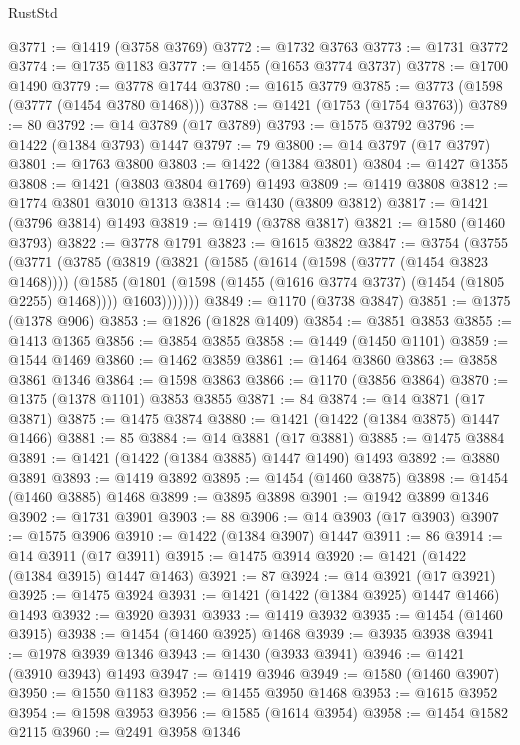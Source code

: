 \begin{lexlean}{RustStd}
\begin{coremodule}
@3771 := @1419 (@3758 @3769)
@3772 := @1732 @3763
@3773 := @1731 @3772
@3774 := @1735 @1183
@3777 := @1455 (@1653 @3774 @3737)
@3778 := @1700 @1490
@3779 := @3778 @1744
@3780 := @1615 @3779
@3785 := @3773 (@1598 (@3777 (@1454 @3780 @1468)))
@3788 := @1421 (@1753 (@1754 @3763))
@3789 := 80
@3792 := @14 @3789 (@17 @3789)
@3793 := @1575 @3792
@3796 := @1422 (@1384 @3793) @1447
@3797 := 79
@3800 := @14 @3797 (@17 @3797)
@3801 := @1763 @3800
@3803 := @1422 (@1384 @3801)
@3804 := @1427 @1355
@3808 := @1421 (@3803 @3804 @1769) @1493
@3809 := @1419 @3808
@3812 := @1774 @3801 @3010 @1313
@3814 := @1430 (@3809 @3812)
@3817 := @1421 (@3796 @3814) @1493
@3819 := @1419 (@3788 @3817)
@3821 := @1580 (@1460 @3793)
@3822 := @3778 @1791
@3823 := @1615 @3822
@3847 := @3754
    (@3755
      (@3771
        (@3785
          (@3819
            (@3821
              (@1585
                (@1614 (@1598 (@3777 (@1454 @3823 @1468))))
                (@1585
                  (@1801 (@1598 (@1455 (@1616 @3774 @3737) (@1454 (@1805 @2255) @1468))))
                  @1603)))))))
@3849 := @1170 (@3738 @3847)
@3851 := @1375 (@1378 @906)
@3853 := @1826 (@1828 @1409)
@3854 := @3851 @3853
@3855 := @1413 @1365
@3856 := @3854 @3855
@3858 := @1449 (@1450 @1101)
@3859 := @1544 @1469
@3860 := @1462 @3859
@3861 := @1464 @3860
@3863 := @3858 @3861 @1346
@3864 := @1598 @3863
@3866 := @1170 (@3856 @3864)
@3870 := @1375 (@1378 @1101) @3853 @3855
@3871 := 84
@3874 := @14 @3871 (@17 @3871)
@3875 := @1475 @3874
@3880 := @1421 (@1422 (@1384 @3875) @1447 @1466)
@3881 := 85
@3884 := @14 @3881 (@17 @3881)
@3885 := @1475 @3884
@3891 := @1421 (@1422 (@1384 @3885) @1447 @1490) @1493
@3892 := @3880 @3891
@3893 := @1419 @3892
@3895 := @1454 (@1460 @3875)
@3898 := @1454 (@1460 @3885) @1468
@3899 := @3895 @3898
@3901 := @1942 @3899 @1346
@3902 := @1731 @3901
@3903 := 88
@3906 := @14 @3903 (@17 @3903)
@3907 := @1575 @3906
@3910 := @1422 (@1384 @3907) @1447
@3911 := 86
@3914 := @14 @3911 (@17 @3911)
@3915 := @1475 @3914
@3920 := @1421 (@1422 (@1384 @3915) @1447 @1463)
@3921 := 87
@3924 := @14 @3921 (@17 @3921)
@3925 := @1475 @3924
@3931 := @1421 (@1422 (@1384 @3925) @1447 @1466) @1493
@3932 := @3920 @3931
@3933 := @1419 @3932
@3935 := @1454 (@1460 @3915)
@3938 := @1454 (@1460 @3925) @1468
@3939 := @3935 @3938
@3941 := @1978 @3939 @1346
@3943 := @1430 (@3933 @3941)
@3946 := @1421 (@3910 @3943) @1493
@3947 := @1419 @3946
@3949 := @1580 (@1460 @3907)
@3950 := @1550 @1183
@3952 := @1455 @3950 @1468
@3953 := @1615 @3952
@3954 := @1598 @3953
@3956 := @1585 (@1614 @3954)
@3958 := @1454 @1582 @2115
@3960 := @2491 @3958 @1346

\end{coremodule}
\end{lexlean}
